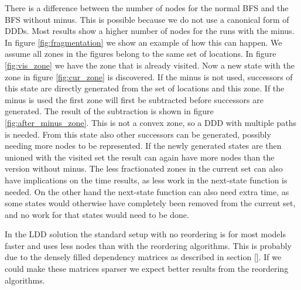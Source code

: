 There is a difference between the number of nodes for the normal BFS and the BFS without minus. This is possible because we do not use a canonical form of DDDs. Most results show a higher number of nodes for the runs with the minus. In figure \ref{fig:fragmentation} we show an example of how this can happen. We assume all zones in the figures belong to the same set of locations. In figure \ref{fig:vis_zone} we have the zone that is already visited. Now a new state with the zone in figure \ref{fig:cur_zone} is discovered. If the minus is not used, successors of this state are directly generated from the set of locations and this zone. If the minus is used the first zone will first be subtracted before successors are generated. The result of the subtraction is shown in figure \ref{fig:after_minus_zone}. This is not a convex zone, so a DDD with multiple paths is needed. From this state also other successors can be generated, possibly needing more nodes to be represented. If the newly generated states are then unioned with the visited set the result can again have more nodes than the version without minus. The less fractionated zones in the current set can also have implications on the time results, as less work in the next-state function is needed. On the other hand the next-state function can also need extra time, as some states would otherwise have completely been removed from the current set, and no work for that states would need to be done. 

In the LDD solution the standard setup with no reordering is for most models faster and uses less nodes than with the reordering algorithms. This is probably due to the densely filled dependency matrices as described in section \ref{}. If we could make these matrices sparser we expect better results from the reordering algorithms. 

